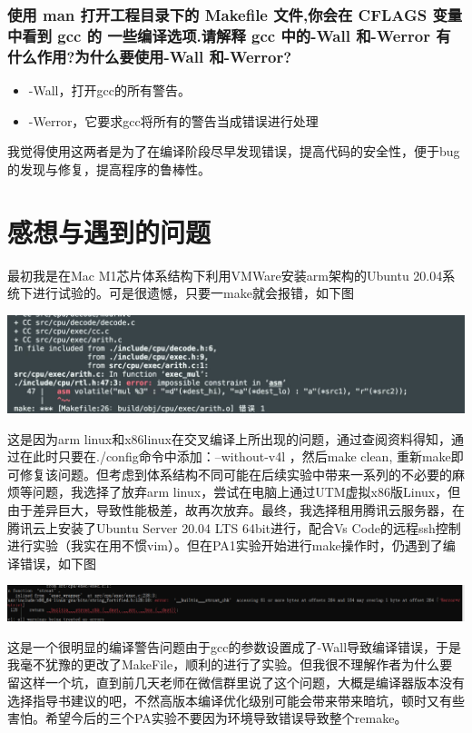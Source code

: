 \documentclass[UTF8,a4paper,10pt]{ctexart}
\begin{document}
\subsubsection*{使用 man 打开工程目录下的 Makefile 文件,你会在 CFLAGS 变量中看到 gcc 的 一些编译选项.请解释 gcc 中的-Wall 和-Werror 有什么作用?为什么要使用-Wall 和-Werror?}
\begin{itemize}
  \item -Wall，打开gcc的所有警告。 
  \item -Werror，它要求gcc将所有的警告当成错误进行处理
\end{itemize}
我觉得使用这两者是为了在编译阶段尽早发现错误，提高代码的安全性，便于bug的发现与修复，提高程序的鲁棒性。

\section{感想与遇到的问题}
最初我是在Mac M1芯片体系结构下利用VMWare安装arm架构的Ubuntu 20.04系统下进行试验的。可是很遗憾，只要一make就会报错，如下图
\begin{center}
  \includegraphics[scale = 0.23]{12}
\end{center}
这是因为arm linux和x86linux在交叉编译上所出现的问题，通过查阅资料得知，通过在此时只要在./config命令中添加：--without-v4l ，然后make clean, 重新make即可修复该问题。但考虑到体系结构不同可能在后续实验中带来一系列的不必要的麻烦等问题，我选择了放弃arm linux，尝试在电脑上通过UTM虚拟x86版Linux，但由于差异巨大，导致性能极差，故再次放弃。最终，我选择租用腾讯云服务器，在腾讯云上安装了Ubuntu Server 20.04 LTS 64bit进行，配合Vs Code的远程ssh控制进行实验（我实在用不惯vim）。但在PA1实验开始进行make操作时，仍遇到了编译错误，如下图
\begin{center}
  \includegraphics[scale = 0.28]{13}
\end{center}
这是一个很明显的编译警告问题由于gcc的参数设置成了-Wall导致编译错误，于是我毫不犹豫的更改了MakeFile，顺利的进行了实验。但我很不理解作者为什么要留这样一个坑，直到前几天老师在微信群里说了这个问题，大概是编译器版本没有选择指导书建议的吧，不然高版本编译优化级别可能会带来带来暗坑，顿时又有些害怕。希望今后的三个PA实验不要因为环境导致错误导致整个remake。
\end{document}
